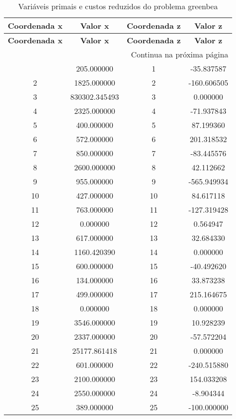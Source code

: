 \documentclass[12pt]{article}
\begin{document}
\begin{longtable}{@{}cccc@{}}
\caption{Variáveis primais e custos reduzidos do problema greenbea} \\
\toprule
\textbf{Coordenada x} & \textbf{Valor x} & \textbf{Coordenada z} & \textbf{Valor z} \\
\midrule
\endfirsthead

\toprule
\textbf{Coordenada x} & \textbf{Valor x} & \textbf{Coordenada z} & \textbf{Valor z} \\
\midrule
\endhead

\midrule \multicolumn{4}{r}{{Continua na próxima página}} \\ \midrule
\endfoot

\bottomrule
\endlastfoot
1 & 205.000000 & 1 & -35.837587 \\
2 & 1825.000000 & 2 & -160.606505 \\
3 & 830302.345493 & 3 & 0.000000 \\
4 & 2325.000000 & 4 & -71.937843 \\
5 & 400.000000 & 5 & 87.199360 \\
6 & 572.000000 & 6 & 201.318532 \\
7 & 850.000000 & 7 & -83.445576 \\
8 & 2600.000000 & 8 & 42.112662 \\
9 & 955.000000 & 9 & -565.949934 \\
10 & 427.000000 & 10 & 84.617118 \\
11 & 763.000000 & 11 & -127.319428 \\
12 & 0.000000 & 12 & 0.564947 \\
13 & 617.000000 & 13 & 32.684330 \\
14 & 1160.420390 & 14 & 0.000000 \\
15 & 600.000000 & 15 & -40.492620 \\
16 & 134.000000 & 16 & 33.873238 \\
17 & 499.000000 & 17 & 215.164675 \\
18 & 0.000000 & 18 & 0.000000 \\
19 & 3546.000000 & 19 & 10.928239 \\
20 & 2337.000000 & 20 & -57.572204 \\
21 & 25177.861418 & 21 & 0.000000 \\
22 & 601.000000 & 22 & -240.515880 \\
23 & 2100.000000 & 23 & 154.033208 \\
24 & 2550.000000 & 24 & -8.904344 \\
25 & 389.000000 & 25 & -100.000000 \\

\end{longtable}
\end{document}

